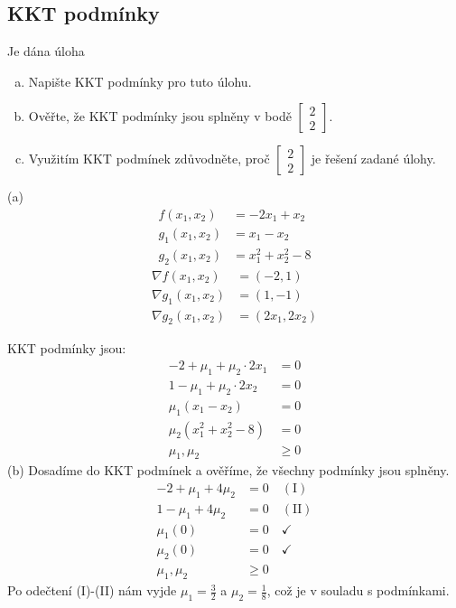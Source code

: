 \subsection{KKT podmínky}
Je dána úloha
\begin{enumerate}[(a)]
    \item Napište KKT podmínky pro tuto úlohu.
    \item Ověřte, že KKT podmínky jsou splněny v bodě $\begin{bmatrix}2 \\ 2\end{bmatrix}$.
    \item Využitím KKT podmínek zdůvodněte, proč $\begin{bmatrix}2 \\ 2\end{bmatrix}$ je řešení zadané úlohy.
\end{enumerate}

(a)
\begin{align*}
    f(x_1, x_2) &= -2x_1 + x_2 \\
    g_1(x_1, x_2) &= x_1 - x_2 \\
    g_2(x_1, x_2) &= x_1^2 + x_2^2 - 8
\end{align*}
\begin{align*}
    \nabla f(x_1, x_2) &= (-2, 1) \\
    \nabla g_1(x_1, x_2) &= (1, -1) \\
    \nabla g_2(x_1, x_2) &= (2x_1, 2x_2)
\end{align*}

KKT podmínky jsou:
\begin{align*}
    -2 + \mu_1 + \mu_2 \cdot 2x_1 &= 0\\
    1 - \mu_1 + \mu_2 \cdot 2x_2 &= 0\\
    \mu_1(x_1 - x_2) &= 0\\
    \mu_2(x_1^2 + x_2^2 - 8) &= 0\\
    \mu_1, \mu_2 &\geq 0
\end{align*}
(b)
Dosadíme do KKT podmínek a ověříme, že všechny podmínky jsou splněny.
\begin{align*}
    -2 + \mu_1 + 4\mu_2 &= 0 \quad (\text{I}) \\
    1 - \mu_1 + 4\mu_2&= 0 \quad (\text{II})\\
    \mu_1(0) &= 0 \quad ✓\\
    \mu_2(0) &= 0 \quad ✓\\
    \mu_1, \mu_2 &\geq 0
\end{align*}
Po odečtení (I)-(II) nám vyjde $\mu_1 = \frac{3}{2}$ a $\mu_2 = \frac{1}{8}$, což je v souladu s podmínkami.


